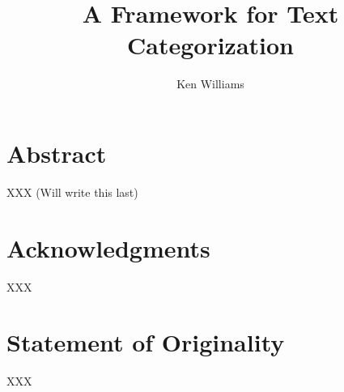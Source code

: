 \documentclass[a4paper]{report}
\title{A Framework for Text Categorization}
\author{Ken Williams}
\begin{document}
\newcommand{\method}[1]{\texttt{#1()}}
\newcommand{\class}[1]{\lccode`:`:\texttt{#1}}
\newcommand{\aclass}[1]{\emph{\class{#1}}}
\newcommand{\aicat}{\class{AI::Categorizer}}

\maketitle
\chapter*{Abstract}
XXX (Will write this last)
\chapter*{Acknowledgments}
XXX
\chapter*{Statement of Originality}
XXX
\tableofcontents










\end{document}
